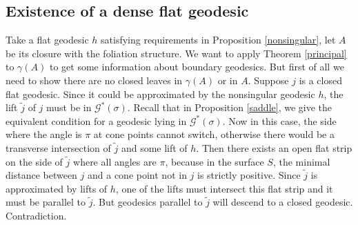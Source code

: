 \documentclass[reqno]{amsart}
\theoremstyle{plain}
\theoremstyle{definition}
\theoremstyle{remark}
\newtheorem*{rmk}{Remark}
\theoremstyle{definition}
\newcommand{\?}{\textcolor{red}{?}}
\newcommand{\Gssigma}{\mathcal{G}^*(\sigma) }
\begin{document}

\subsection{Existence of a dense flat geodesic}

Take a flat geodesic $h$ satisfying requirements in Proposition \ref{nonsingular}, let $A$ be its closure with the foliation structure. We want to apply Theorem \ref{principal} to $\gamma(A)$ to get some information about boundary geodesics. But first of all we need to show there are no closed leaves in $\gamma(A)$ or in $A$. Suppose $j$ is a closed flat geodesic. Since it could be approximated by the nonsingular geodesic $h$, the lift $\tilde{j}$ of $j$ must be in $\Gssigma$. Recall that in Proposition \ref{saddle}, we give the equivalent condition for a geodesic lying in $\Gssigma$. Now in this case, the side where the angle is $\pi$ at cone points cannot switch, otherwise there would be a transverse intersection of $\tilde{j}$ and some lift of $h$. Then there exists an open flat strip on the side of $\tilde{j}$ where all angles are $\pi$, because in the surface $S$, the minimal distance between $j$ and a cone point not in $j$ is strictly positive. Since $\tilde{j}$ is approximated by lifts of $h$, one of the lifts must intersect this flat strip and it must be parallel to $\tilde{j}$. But geodesics parallel to $\tilde{j}$ will descend to a closed geodesic. Contradiction.
\end{document}
